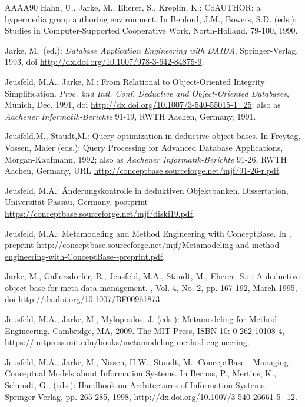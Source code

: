 \begin{thebibliography}{AAAA90}
 Hahn, U., Jarke, M., Eherer, S., Kreplin, K.:
CoAUTHOR: a hypermedia group authoring environment. In Benford, J.M.,
Bowers, S.D.  (eds.): Studies in Computer-Supported Cooperative Work,
North-Holland, 79-100, 1990.

Jarke, M.\ (ed.):
{\em Database Application Engineering with DAIDA},
Springer-Verlag, 1993,
doi \url{http://dx.doi.org/10.1007/978-3-642-84875-9}.


 Jeusfeld, M.A., Jarke, M.: From Relational to
Object-Oriented Integrity Simplification. {\it Proc. 2nd Intl. Conf.
Deductive and Object-Oriented Databases\/}, Munich, Dec. 1991,
doi \url{http://dx.doi.org/10.1007/3-540-55015-1_25}; also as
{\it Aachener Informatik-Berichte\/} 91-19, RWTH Aachen, Germany, 1991.

 Jeusfeld,M., Staudt,M.: Query optimization in deductive
object bases. In Freytag, Vossen, Maier (eds.): Query
Processing for Advanced Database Applications, Morgan-Kaufmann, 1992;
also as {\it Aachener Informatik-Berichte\/} 91-26, RWTH Aachen, Germany, URL
\url{http://conceptbase.sourceforge.net/mjf/91-26-r.pdf}.

 Jeusfeld, M.A.:
\"Anderungskontrolle in deduktiven Objektbanken.
Dissertation, Universit\"at Passau, Germany,
postprint \url{https://conceptbase.sourceforge.net/mjf/diski19.pdf}.

 Jeusfeld, M.A.:
Metamodeling and Method Engineering with ConceptBase.
In \cite{jjm09},
preprint \url{http://conceptbase.sourceforge.net/mjf/Metamodeling-and-method-engineering-with-ConceptBase--preprint.pdf}.

Jarke, M., Gallersd\"orfer, R., Jeusfeld, M.A., Staudt, M., Eherer, S.:
: A deductive object base for meta data management.
, Vol. 4, No. 2, pp. 167-192,
  March 1995, doi
\url{http://dx.doi.org/10.1007/BF00961873}.

Jeusfeld, M.A., Jarke, M., Mylopoulos, J. (eds.):
Metamodeling for Method Engineering.
Cambridge, MA, 2009. The MIT Press, ISBN-10: 0-262-10108-4,
\url{https://mitpress.mit.edu/books/metamodeling-method-engineering}.


Jeusfeld, M.A., Jarke, M., Nissen, H.W., Staudt, M.:
ConceptBase - Managing Conceptual Models about Information Systems.
In Bernus, P., Mertins, K., Schmidt, G., (eds.):
Handbook on Architectures of Information Systems, Springer-Verlag, pp. 265-285, 1998,
\url{http://dx.doi.org/10.1007/3-540-26661-5_12}.


\end{thebibliography}
